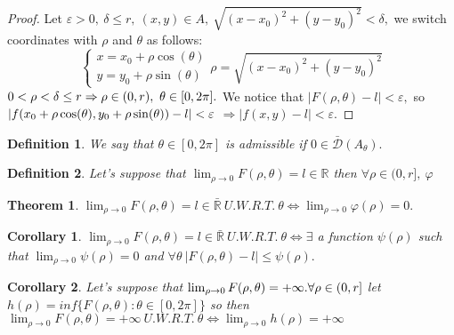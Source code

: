 \documentclass{article}
\newtheorem{theorem}{Theorem}
\newtheorem{definition}{Definition}
\newtheorem{corollary}{Corollary}
\begin{document}
\begin{proof}
        Let $\varepsilon > 0, \ \delta \leq r, \ (x,y) \in A, \ \sqrt{(x - x_0)^2 + (y - y_0)^2} < \delta,$ we switch coordinates with $\rho$ and $\theta$ as follows:
            \begin{equation*}
                \begin{cases}
                    x = x_0 + \rho \cos(\theta) \\
                    y = y_0 + \rho \sin(\theta)  
                \end{cases} \rho = \sqrt{(x - x_0)^2 + (y - y_0)^2} 
            \end{equation*}
        $0< \rho < \delta \leq r \Rightarrow \rho \in (0,r), \ \theta \in [0,2\pi]. \\$ 
        We notice that $ \left\lvert F(\rho, \theta) - l \right\rvert < \varepsilon,$ so $ \left\lvert f(x_0 + \rho \cos(\theta), y_0 + \rho \sin(\theta)) - l \right\rvert < \varepsilon \\$
        $ \Rightarrow  \left\lvert f(x,y) - l \right\rvert < \varepsilon.$
    \end{proof}
    \begin{definition}
        We say that $\theta \in [0,2\pi]$ is admissible if $ 0\in \bar{\mathcal{D}}(A_\theta).$
    \end{definition}
    \begin{definition}
        Let's suppose that $\lim_{\rho \to 0} F(\rho, \theta) = l \in \mathbb{R}$ then $\forall \rho \in (0,r], \ \varphi$
    \end{definition}
    \begin{theorem}
        $\lim_{\rho \to 0} F(\rho, \theta) = l \in \bar{\mathbb{R}} \ U.W.R.T. \ \theta \Longleftrightarrow \lim_{\rho \to 0 } \varphi(\rho) = 0.$
    \end{theorem}
    \begin{corollary}
        $\lim_{\rho \to 0} F(\rho, \theta) = l \in \bar{\mathbb{R}} \ U.W.R.T. \ \theta \Longleftrightarrow \exists$ a function $\psi(\rho)$ such that $\lim_{\rho \to 0} \psi(\rho) = 0$ and $\forall \theta \ \left\lvert F(\rho, \theta) - l\right\rvert \leqslant \psi(\rho).$
    \end{corollary}
    \begin{corollary}
        Let's suppose that $\lim_{\rho \to 0} F(\rho, \theta) = +\infty. \\ \forall \rho \in (0,r]$ let $h(\rho) = inf\{F(\rho, \theta) : \theta \in [0,2\pi] \}$ so then $\lim_{\rho \to 0} F(\rho, \theta) = +\infty \ U.W.R.T. \ \theta \Longleftrightarrow \lim_{\rho \to 0} h(\rho) = +\infty $
    \end{corollary}
\end{document}
